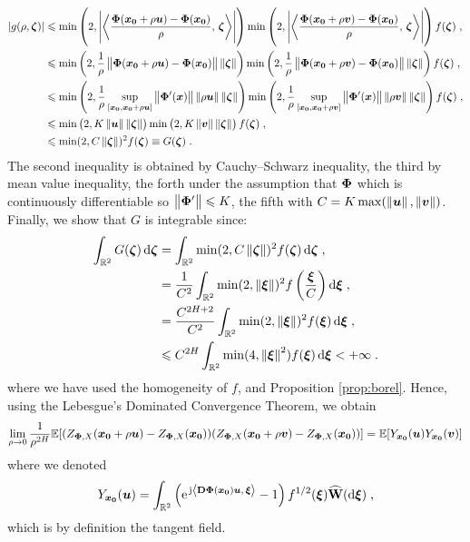 \documentclass{elsarticle}
\begin{document}
\begin{align*}
\lvert g(\rho,\bm{\zeta})\rvert
&\leqslant \min \left(2,\left \lvert \left \langle \frac{\mathbf{\Phi}(\bm{x_0}+\rho \bm{u})-\mathbf{\Phi}(\bm{x_0})}{\rho},\, \bm{\zeta}\right \rangle\right \rvert\right)\min \left(2,\left \lvert \left \langle \frac{\mathbf{\Phi}(\bm{x_0}+\rho \bm{v})-\mathbf{\Phi}(\bm{x_0})}{\rho},\, \bm{\zeta}\right \rangle\right \rvert\right)f(\bm{\zeta})\;,\\
&\leqslant \min \left(2,\frac{1}{\rho}\left\lVert\mathbf{\Phi}(\bm{x_0}+\rho \bm{u})-\mathbf{\Phi}(\bm{x_0})\right\rVert \left\lVert\bm{\zeta}\right\rVert\right)\min \left(2,\frac{1}{\rho}\left\lVert\mathbf{\Phi}(\bm{x_0}+\rho \bm{v})-\mathbf{\Phi}(\bm{x_0})\right\rVert \left\lVert\bm{\zeta}\right\rVert\right)f(\bm{\zeta})\;,\\
&\leqslant \min \left(2,\frac{1}{\rho}\sup_{[\bm{x_0},\bm{x_0}+\rho \bm{u}]}\left\lVert\mathbf{\Phi}'(\bm{x})\right\rVert\left\lVert\rho \bm{u}\right\rVert \left\lVert\bm{\zeta}\right\rVert\right)\min \left(2,\frac{1}{\rho}\sup_{[\bm{x_0},\bm{x_0}+\rho \bm{v}]}\left\lVert\mathbf{\Phi}'(\bm{x})\right\rVert\left\lVert\rho \bm{v}\right\rVert \left\lVert\bm{\zeta}\right\rVert\right)f(\bm{\zeta})\;,\\
&\leqslant \min \left(2,K\left\lVert\bm{u}\right\rVert \left\lVert\bm{\zeta}\right\rVert\right)\min \left(2,K\left\lVert\bm{v}\right\rVert \left\lVert\bm{\zeta}\right\rVert\right)f(\bm{\zeta})\;,\\
&\leqslant \min(2,C\left\lVert\bm{\zeta}\right\rVert)^2f(\bm{\zeta})\equiv G(\bm{\zeta})\;.
\end{align*}
The second inequality is obtained by Cauchy--Schwarz inequality, the third by mean value inequality, the forth under the assumption that $\mathbf{\Phi}$ which is continuously differentiable so $\left\lVert\mathbf{\Phi}'\right\rVert\leqslant K$, the fifth with $C=K\max(\left\lVert\bm{u}\right\rVert,\left\lVert\bm{v}\right\rVert)$. Finally, we show that $G$ is integrable since:
\begin{align*}
\int_{\mathbb{R}^2}G(\vect{\zeta})\dif \vect{\zeta}
&=\int_{\mathbb{R}^2} \min(2,C\norme{\vect{\zeta}})^2f(\vect{\zeta})\dif \vect{\zeta}\;,\\
&=\frac{1}{C^2}\int_{\mathbb{R}^2} \min(2,\norme{\vect{\xi}})^2f\left(\frac{\vect{\xi}}{C}\right)\dif \vect{\xi}\;,\\
&=\frac{C^{2H+2}}{C^2}\int_{\mathbb{R}^2} \min(2,\norme{\vect{\xi}})^2f(\vect{\xi})\dif \vect{\xi}\;,\\
&\leqslant C^{2H}\int_{\mathbb{R}^2} \min(4,\norme{\vect{\xi}}^2) f(\vect{\xi})\dif \vect{\xi}<+\infty\;.
\end{align*}
where we have used  the homogeneity of $f$, and Proposition \ref{prop:borel}. Hence, using the Lebesgue's Dominated Convergence Theorem, we obtain
\[
\lim_{\rho\to 0} \frac{1}{\rho^{2H}}\mathbb{E}[(Z_{\mathbf{\Phi},X}(\bm{x_0}+\rho \bm{u})-Z_{\mathbf{\Phi},X}(\bm{x_0}))(Z_{\mathbf{\Phi},X}(\bm{x_0}+\rho \bm{v})-Z_{\mathbf{\Phi},X}(\bm{x_0}))]=\mathbb{E}[Y_{\bm{x_0}}(\bm{u})Y_{\bm{x_0}}(\bm{v})]
\]
where we denoted
\[
Y_{\bm{x_0}}(\bm{u})=\int_{\mathbb{R}^2} \left(\mathrm{e}^{\, \mathrm{j} \left \langle  \mathbf{D}\mathbf{\Phi}(\bm{x_0})\bm{u},\, \bm{\xi}\right \rangle}-1\right)f^{1/2}(\bm{\xi})\mathbf{\widehat W}(\mathop{}\mathopen{}\mathrm{d} \bm{\xi})\;,
\]
which is by definition the tangent field. 
\end{document}
